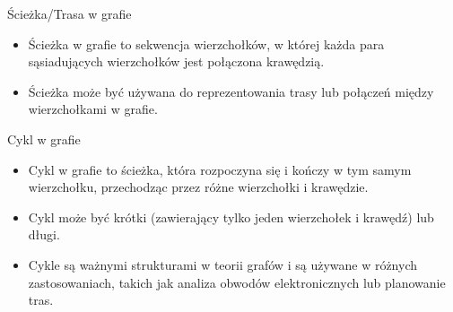 \documentclass[polish,envcountsect,10pt]{beamer}
\begin{document}
\begin{frame}{Ścieżka/Trasa w grafie}
    \begin{itemize}
        \item Ścieżka w grafie to sekwencja wierzchołków, w której każda para sąsiadujących wierzchołków jest połączona krawędzią.
        \item Ścieżka może być używana do reprezentowania trasy lub połączeń między wierzchołkami w grafie.
    \end{itemize}  
    \begin{center}
    \end{center}
\end{frame}

\begin{frame}{Cykl w grafie}
    \begin{itemize}
        \item Cykl w grafie to ścieżka, która rozpoczyna się i kończy w tym samym wierzchołku, przechodząc przez różne wierzchołki i krawędzie.
        \item Cykl może być krótki (zawierający tylko jeden wierzchołek i krawędź) lub długi.
        \item Cykle są ważnymi strukturami w teorii grafów i są używane w różnych zastosowaniach, takich jak analiza obwodów elektronicznych lub planowanie tras.
    \end{itemize}  
    \begin{center}
    \end{center}
\end{frame}
\end{document}
